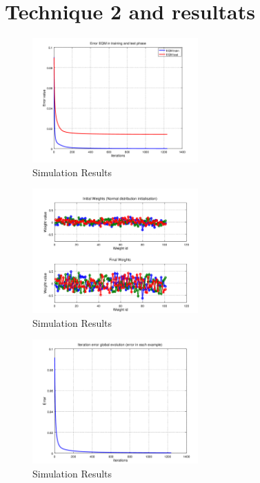 \documentclass[journal]{IEEEtran}
\begin{document}
\section{Technique 2 and resultats}\blindtext


%
%
\blindtext
\begin{figure}[h]
	\centering
	\includegraphics[width=2.5in]{../OctaveNeurons/rs31}
	\caption{Simulation Results}
	\label{fig_sim}
\end{figure}
\blindtext

\blindtext
\begin{figure}[h]
	\centering
	\includegraphics[width=2.5in]{../OctaveNeurons/rs33}
	\caption{Simulation Results}
	\label{fig_sim}
\end{figure}
\begin{figure}[h]
	\centering
	\includegraphics[width=2.5in]{../OctaveNeurons/rs34}
	\caption{Simulation Results}
	\label{fig_sim}
\end{figure}
\end{document}
